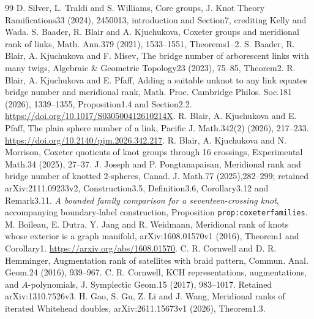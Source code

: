 \documentclass[11pt]{article}
\begin{document}
\begin{thebibliography}{99}
 D. Silver, L. Traldi and S. Williams, Core groups,
J. Knot Theory Ramifications33 (2024), 2450013, introduction
and Section7, crediting Kelly and Wada.
 S. Baader, R. Blair and A. Kjuchukova,
Coxeter groups and meridional rank of links, Math. Ann.379 (2021),
1533--1551, Theorems1--2.
 S. Baader, R. Blair, A. Kjuchukova and F. Misev,
The bridge number of arborescent links with many twigs,
Algebraic \& Geometric Topology23 (2023), 75--85, Theorem2.
 R. Blair, A. Kjuchukova and E. Pfaff, Adding a
suitable unknot to any link equates bridge number and meridional rank,
Math. Proc. Cambridge Philos. Soc.181 (2026), 1339--1355,
Proposition1.4 and Section2.2.
\url{https://doi.org/10.1017/S030500412610214X}.
 R. Blair, A. Kjuchukova and E. Pfaff,
The plain sphere number of a link, Pacific J. Math.342(2) (2026),
217--233. \url{https://doi.org/10.2140/pjm.2026.342.217}.
 R. Blair, A. Kjuchukova and N. Morrison,
Coxeter quotients of knot groups through 16 crossings,
Experimental Math.34 (2025), 27--37.
 J. Joseph and P. Pongtanapaisan, Meridional rank and
bridge number of knotted 2-spheres, Canad. J. Math.77 (2025),282--299;
retained arXiv:2111.09233v2, Construction3.5, Definition3.6,
Corollary3.12 and Remark3.11.
 \emph{A bounded family comparison for a
seventeen-crossing knot}, accompanying boundary-label construction,
Proposition \texttt{prop:coxeterfamilies}.
 M. Boileau, E. Dutra, Y. Jang and R. Weidmann,
Meridional rank of knots whose exterior is a graph manifold,
arXiv:1608.01570v1 (2016), Theorem1 and Corollary1.
\url{https://arxiv.org/abs/1608.01570}.
 C. R. Cornwell and D. R. Hemminger,
Augmentation rank of satellites with braid pattern,
Commun. Anal. Geom.24 (2016), 939--967.
 C. R. Cornwell, KCH representations, augmentations,
and $A$-polynomials, J. Symplectic Geom.15 (2017), 983--1017.
Retained arXiv:1310.7526v3.
 H. Gao, S. Gu, Z. Li and J. Wang,
Meridional ranks of iterated Whitehead doubles,
arXiv:2611.15673v1 (2026), Theorem1.3.
\end{thebibliography}
\end{document}
